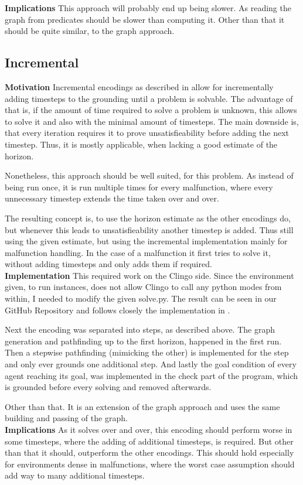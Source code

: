 \textbf{Implications} This approach will probably end up being slower. As reading the graph from predicates should be slower than computing it. Other than that it should be quite similar, to the graph approach.

\subsection{Incremental}
\textbf{Motivation} Incremental encodings as described in \cite{incr} allow for incrementally adding timesteps to the grounding until a problem is solvable. The advantage of that is, if the amount of time required to solve a problem is unknown, this allows to solve it and also with the minimal amount of timesteps. The main downside is, that every iteration requires it to prove unsatisfieability before adding the next timestep. Thus, it is mostly applicable, when lacking a good estimate of the horizon.

Nonetheless, this approach should be well suited, for this problem. As instead of being run once, it is run multiple times for every malfunction, where every unnecessary timestep extends the time taken over and over.

The resulting concept is, to use the horizon estimate as the other encodings do, but whenever this leads to unsatisfieability another timestep is added. Thus still using the given estimate, but using the incremental implementation mainly for malfunction handling. In the case of a malfunction it first tries to solve it, without adding timesteps and only adds them if required.\\

\noindent \textbf{Implementation} This required work on the Clingo side. Since the environment given, to run instances, does not allow Clingo to call any python modes from within, I needed to modify the given solve.py. The result can be seen in our GitHub Repository and follows closely the implementation in \cite{incr}.

Next the encoding was separated into steps, as described above. The graph generation and pathfinding up to the first horizon, happened in the first run. Then a stepwise pathfinding (mimicking the other) is implemented for the step and only ever grounds one additional step. And lastly the goal condition of every agent reaching its goal, was implemented in the check part of the program, which is grounded before every solving and removed afterwards.

Other than that. It is an extension of the graph approach and uses the same building and passing of the graph.\\

\noindent \textbf{Implications} As it solves over and over, this encoding should perform worse in some timesteps, where the adding of additional timesteps, is required. But other than that it should, outperform the other encodings. This should hold especially for environments dense in malfunctions, where the worst case assumption should add way to many additional timesteps.